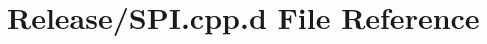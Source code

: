 \hypertarget{_release_2_s_p_i_8cpp_8d}{\section{\-Release/\-S\-P\-I.cpp.\-d \-File \-Reference}
\label{_release_2_s_p_i_8cpp_8d}
}
